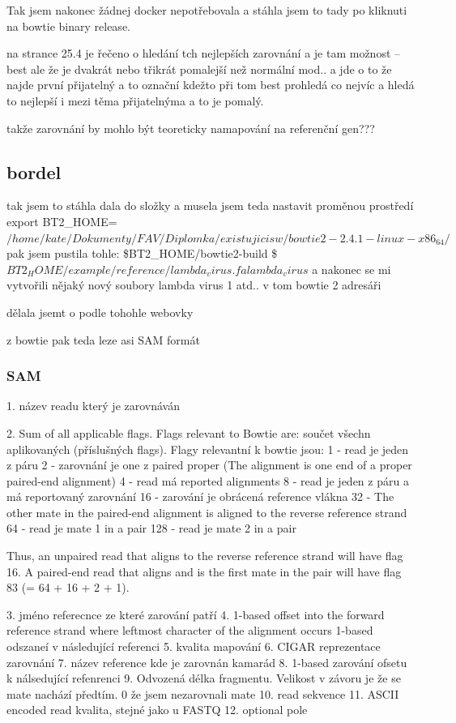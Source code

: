 \documentclass[czech,DP]{thesiskiv}
\begin{document}
Tak jsem nakonec žádnej docker nepotřebovala a stáhla jsem to tady %
 po kliknuti na bowtie binary release.

na strance 25.4 je řečeno o hledání tch nejlepších zarovnání a je tam možnost --best ale že je dvakrát nebo třikrát pomalejší než normální mod.. a jde o to že najde první přijatelný a to označní kdežto při tom best prohledá co nejvíc a hledá to nejlepší i mezi těma přijatelnýma a to je pomalý.

takže zarovnání by mohlo být teoreticky namapování na referenční gen???

\subsection{bordel}
tak jsem  to stáhla dala do složky a musela jsem teda nastavit proměnou prostředí 
export BT2\_HOME=$/home/kate/Dokumenty/FAV/Diplomka/existujicisw/bowtie2-2.4.1-linux-x86_64/$
pak jsem pustila tohle: 
\$BT2\_HOME/bowtie2-build \$ $BT2_HOME/example/reference/lambda_virus.fa lambda_virus$
a nakonec se mi vytvořili nějaký nový soubory lambda virus 1 atd.. v tom bowtie 2 adresáři

dělala jsemt o podle tohohle webovky %


z bowtie pak teda leze asi SAM formát

\subsubsection{SAM}
1. název readu který je zarovnáván

2. Sum of all applicable flags. Flags relevant to Bowtie are:
součet všechn aplikovaných (příslušných flags). Flagy relevantní k bowtie jsou: 
1 - read je jeden z páru
2 - zarovnání je one z paired proper (The alignment is one end of a proper paired-end alignment)
4 - read má reported alignments
8 - read je jeden z páru a má reportovaný zarovnání
16 - zarování je obrácená reference vlákna
32 - The other mate in the paired-end alignment is aligned to the reverse reference strand
64 - read je mate 1 in a pair
128 - read je mate 2 in a pair

Thus, an unpaired read that aligns to the reverse reference strand will have flag 16. A paired-end read that aligns and is the first mate in the pair will have flag 83 (= 64 + 16 + 2 + 1).

3. jméno referecnce ze které zarování patří
4. 1-based offset into the forward reference strand where leftmost character of the alignment occurs 1-based odszaneí v následující referenci 
5. kvalita mapování
6. CIGAR reprezentace zarovnání
7. název reference kde je zarovnán kamarád 
8. 1-based zarování ofsetu k nálsedující refenrenci 
9. Odvozená délka fragmentu. Velikost v závoru je že se mate nachází předtím. 0 že jsem nezarovnali mate
10. read sekvence
11. ASCII encoded read kvalita, stejné jako u FASTQ
12. optional pole
\end{document}
